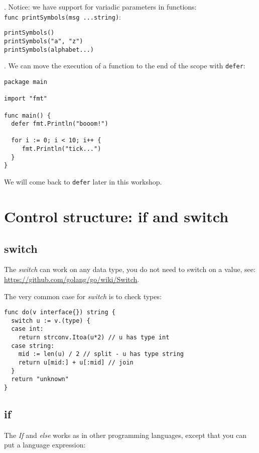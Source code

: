\documentclass[11pt, letterpaper]{article}
\begin{document}
. Notice: we have support for variadic parameters in functions:\\ \texttt{func printSymbols(msg ...string)}:

\begin{verbatim}
printSymbols()
printSymbols("a", "z")
printSymbols(alphabet...)
\end{verbatim}

. We can move the execution of a function to the end of the scope with \verb|defer|:

\begin{verbatim}
package main

import "fmt"

func main() {
  defer fmt.Println("booom!")

  for i := 0; i < 10; i++ {
     fmt.Println("tick...")
  }
}
\end{verbatim}

We will come back to \texttt{defer} later in this workshop.

\section{Control structure: if and switch}

\subsection{switch}

The \emph{switch} can work on any data type, you do not need to switch on a value, see: \href{Golang Wiki}{https://github.com/golang/go/wiki/Switch}.

The very common case for \emph{switch} is to check types:

\begin{verbatim}
func do(v interface{}) string {
  switch u := v.(type) {
  case int:
    return strconv.Itoa(u*2) // u has type int
  case string:
    mid := len(u) / 2 // split - u has type string
    return u[mid:] + u[:mid] // join
  }
  return "unknown"
}
\end{verbatim}

\subsection{if}

The \emph{If} and \emph{else} works as in other programming languages, except that you can put a language expression:
\end{document}
